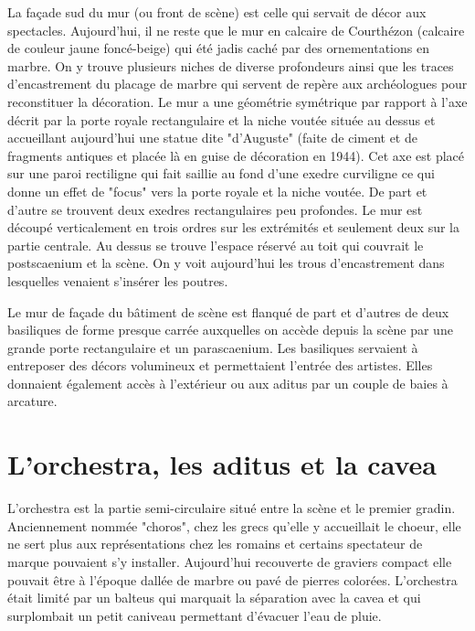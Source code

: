 		La façade sud du mur (ou front de scène) est celle qui servait de décor aux spectacles. Aujourd'hui, il ne reste que le mur en calcaire de Courthézon (calcaire de couleur jaune foncé-beige) qui été jadis caché par des ornementations en marbre. On y trouve plusieurs niches de diverse profondeurs ainsi que les traces d'encastrement du placage de marbre qui servent de repère aux archéologues pour reconstituer la décoration. Le mur a une géométrie symétrique par rapport à l'axe décrit par la porte royale rectangulaire et la niche voutée située au dessus et accueillant aujourd'hui une statue dite "d'Auguste" (faite de ciment et de fragments antiques et placée là en guise de décoration en 1944). Cet axe est placé sur une paroi rectiligne qui fait saillie au fond d'une \gls{exedre} curviligne ce qui donne un effet de "focus" vers la porte royale et la niche voutée. De part et d'autre se trouvent deux  \glspl{exedre} rectangulaires peu profondes. Le mur est découpé verticalement en trois ordres sur les extrémités et seulement deux sur la partie centrale. Au dessus se trouve l'espace réservé au toit qui couvrait le \gls{postscaenium} et la scène. On y voit aujourd'hui les trous d'encastrement dans lesquelles venaient s'insérer les poutres.
		
		Le mur de façade du bâtiment de scène est flanqué de part et d'autres de deux \glspl{basilique} de forme presque carrée auxquelles on accède depuis la scène par une grande porte rectangulaire et un \gls{parascaenium}. Les \glspl{basilique} servaient à entreposer des décors volumineux et permettaient l'entrée des artistes. Elles donnaient également accès à l'extérieur ou aux \gls{aditus} par un couple de baies à arcature.
		
				
		\section{L'\gls{orchestra}, les \gls{aditus} et la \gls{cavea}}
		
	
	L'\gls{orchestra} est la partie semi-circulaire situé entre la scène et le premier gradin. Anciennement nommée "choros", chez les grecs qu'elle y accueillait le choeur, elle ne sert plus aux représentations chez les romains et certains spectateur de marque pouvaient s'y installer. Aujourd'hui recouverte de graviers compact elle pouvait être à l'époque dallée de marbre ou pavé de pierres colorées. L'\gls{orchestra} était limité par un \gls{balteus} qui marquait la séparation avec la \gls{cavea} et qui surplombait un petit caniveau permettant d'évacuer l'eau de pluie.
	

